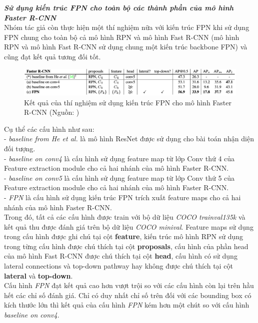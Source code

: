 {    \noindent
    \textbf{\textit{Sử dụng kiến trúc FPN cho toàn bộ các thành phần của mô hình Faster R-CNN}} \\
    Nhóm tác giả còn thực hiện một thí nghiệm nữa với kiến trúc FPN khi sử dụng FPN chung cho toàn bộ cả mô hình RPN và mô hình Fast R-CNN (mô hình RPN và mô hình Fast R-CNN sử dụng chung một kiến trúc backbone FPN) và cũng đạt kết quả tương đối tốt.

    \begin{figure}[H]
        \centering
        \includegraphics[width=12cm] {images/fpn_results_3}
        \caption{Kết quả của thí nghiệm sử dụng kiến trúc FPN cho mô hình Faster R-CNN (Nguồn: \cite{lin2017feature})}
        \label{fig:fpn_results_3}
    \end{figure}

    \noindent
    Cụ thể các cấu hình như sau: \\
    - \textit{baseline from He et al.} là mô hình ResNet được sử dụng cho bài toán nhận diện đối tượng. \\
    - \textit{baseline on conv4} là cấu hình sử dụng feature map từ lớp Conv thứ 4 của Feature extraction module cho cả hai nhánh của mô hình Faster R-CNN. \\
    - \textit{baseline on conv5} là cấu hình sử dụng feature map từ lớp Conv thứ 5 của Feature extraction module cho cả hai nhánh của mô hình Faster R-CNN. \\
    - \textit{FPN} là cấu hình sử dụng kiến trúc FPN trích xuất feature maps cho cả hai nhánh của mô hình Faster R-CNN. \\
    Trong đó, tất cả các cấu hình được train với bộ dữ liệu \textit{COCO trainval135k} và kết quả thu được đánh giá trên bộ dữ liệu \textit{COCO minival}.
    Feature maps sử dụng trong cấu hình được ghi chú tại cột \textbf{feature}, kiến trúc mô hình RPN sử dụng trong từng cấu hình được chú thích tại cột \textbf{proposals}, cấu hình của phần head của mô hình Fast R-CNN được chú thích tại cột \textbf{head}, cấu hình có sử dụng lateral connections và top-down pathway hay không được chú thích tại cột \textbf{lateral} và \textbf{top-down}. \\
    Cấu hình \textit{FPN} đạt kết quả cao hơn vượt trội so với các cấu hình còn lại trên hầu hết các chỉ số đánh giá.
    Chỉ có duy nhất chỉ số trên đối với các bounding box có kích thước lớn thì kết quả của cấu hình \textit{FPN} kém hơn một chút so với cấu hình \textit{baseline on conv4}.

}
